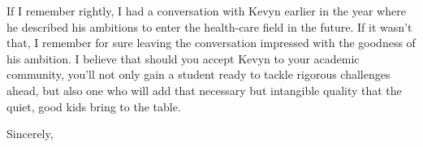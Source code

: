 \documentclass[11pt, letterpaper]{letter} %
\begin{document}
\begin{letter}
If I remember rightly, I had a conversation with Kevyn earlier in the year where he described his ambitions to enter the health-care field in the future. If it wasn't that, I remember for sure leaving the conversation impressed with the goodness of his ambition. I believe that should you accept Kevyn to your academic community, you'll not only gain a student ready to tackle rigorous challenges ahead, but also one who will add that necessary but intangible quality that the quiet, good kids bring to the table.

\closing{Sincerely,}




\end{letter}
\end{document}
